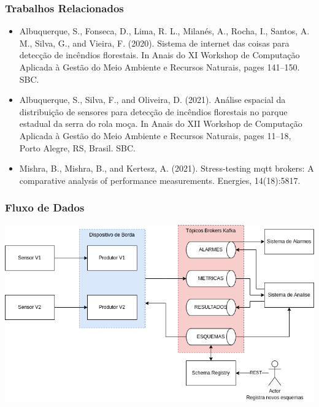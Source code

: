 \documentclass[hyperref={bookmarks=false},aspectratio=169]{beamer}
\begin{document}
\begin{frame}
\frametitle{Trabalhos Relacionados}
\begin{itemize}
    \item   Albuquerque, S., Fonseca, D., Lima, R. L., Milanés, A., Rocha, I., Santos, A. M., Silva, G., and Vieira, F. (2020). Sistema de internet das coisas para detecção de incêndios florestais. In Anais do XI Workshop de Computação Aplicada à Gestão do Meio Ambiente e Recursos Naturais, pages 141–150. SBC.
    \item   Albuquerque, S., Silva, F., and Oliveira, D. (2021). Análise espacial da distribuição de sensores para detecção de incêndios florestais no parque estadual da serra do rola moça. In Anais do XII Workshop de Computação Aplicada à Gestão do Meio Ambiente e Recursos Naturais, pages 11–18, Porto Alegre, RS, Brasil. SBC.
    \item   Mishra, B., Mishra, B., and Kertesz, A. (2021). Stress-testing mqtt brokers: A comparative analysis of performance measurements. Energies, 14(18):5817.
\end{itemize}
\end{frame}

\begin{frame}
\frametitle{Fluxo de Dados}
\includegraphics[scale=0.5]{imagens/fluxo_de_dados.png}
\end{frame}
\end{document}
